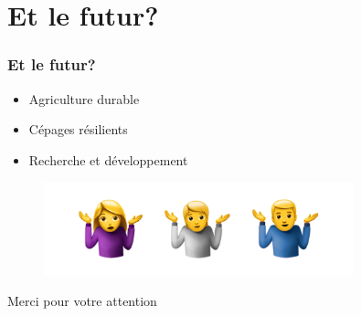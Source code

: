 \documentclass{beamer}
\begin{document}
\section{Et le futur?}

		\begin{frame}
		\frametitle{Et le futur?}
		\begin{itemize}
			\item Agriculture durable
			\item Cépages résilients
			\item Recherche et développement
		\end{itemize}
	
		
			\begin{figure}
			\includegraphics[width=0.8\textwidth]{futur}
			\label{fig:example}
		\end{figure}
	
	
	\end{frame}

	

	\begin{frame}
	\begin{center}
{\LARGE Merci pour votre attention }
	\end{center}
\end{frame}



	
\end{document}
